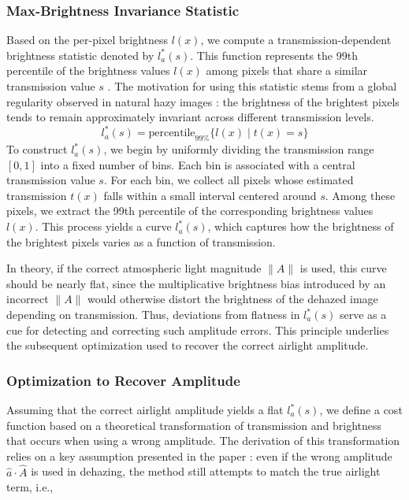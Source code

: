 \documentclass[conference]{IEEEtran}
\begin{document}




\subsubsection{Max-Brightness Invariance Statistic}
Based on the per-pixel brightness \( l(x) \), we compute a transmission-dependent brightness statistic denoted by \( l^*_a(s) \). This function represents the 99th percentile of the brightness values \( l(x) \) among pixels that share a similar transmission value \( s \) \cite{airlight}. The motivation for using this statistic stems from a global regularity observed in natural hazy images \cite{airlight}: the brightness of the brightest pixels tends to remain approximately invariant across different transmission levels.
\begin{equation}
\label{brightness_statistic}
l^*_a(s) = \text{percentile}_{99\%} \{ l(x) \mid t(x) = s \}
\end{equation}
To construct \( l^*_a(s) \), we begin by uniformly dividing the transmission range \([0, 1]\) into a fixed number of bins. Each bin is associated with a central transmission value \( s \). For each bin, we collect all pixels whose estimated transmission \( t(x) \) falls within a small interval centered around \( s \). Among these pixels, we extract the 99th percentile of the corresponding brightness values \( l(x) \). This process yields a curve \( l^*_a(s) \), which captures how the brightness of the brightest pixels varies as a function of transmission.

In theory, if the correct atmospheric light magnitude \( \|A\| \) is used, this curve should be nearly flat, since the multiplicative brightness bias introduced by an incorrect \( \|A\| \)  would otherwise distort the brightness of the dehazed image depending on transmission. Thus, deviations from flatness in \( l^*_a(s) \) serve as a cue for detecting and correcting such amplitude errors. This principle underlies the subsequent optimization used to recover the correct airlight amplitude.

\subsubsection{Optimization to Recover Amplitude}

Assuming that the correct airlight amplitude yields a flat \( l^*_a(s) \), we define a cost function based on a theoretical transformation of transmission and brightness that occurs when using a wrong amplitude. The derivation of this transformation relies on a key assumption presented in the paper \cite{airlight} : even if the wrong amplitude \( \hat{a} \cdot \hat{A}\) is used in dehazing, the method still attempts to match the true airlight term, i.e.,
\end{document}
